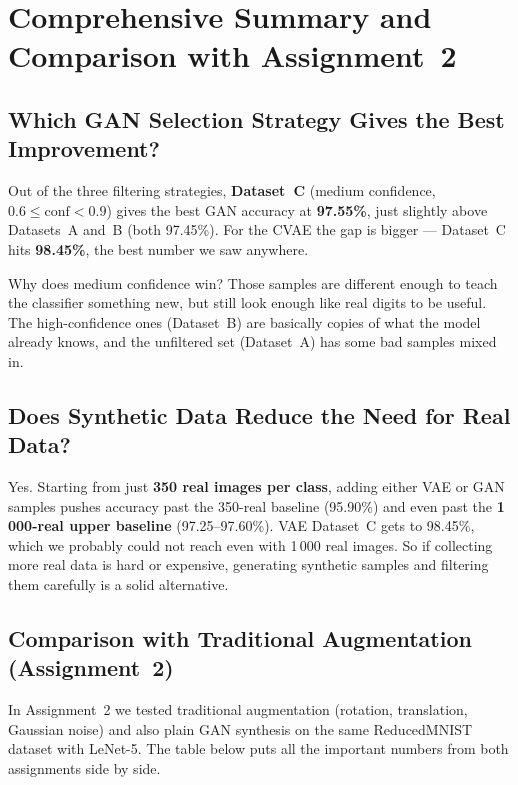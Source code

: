 \documentclass[12pt, a4paper]{article}
\begin{document}
\section{Comprehensive Summary and Comparison with Assignment~2}

\subsection{Which GAN Selection Strategy Gives the Best Improvement?}

Out of the three filtering strategies, \textbf{Dataset~C} (medium confidence,
$0.6 \leq \text{conf} < 0.9$) gives the best GAN accuracy at \textbf{97.55\%},
just slightly above Datasets~A and~B (both 97.45\%).  For the CVAE the gap is
bigger --- Dataset~C hits \textbf{98.45\%}, the best number we saw anywhere.

Why does medium confidence win?  Those samples are different enough to teach the
classifier something new, but still look enough like real digits to be useful.
The high-confidence ones (Dataset~B) are basically copies of what the model
already knows, and the unfiltered set (Dataset~A) has some bad samples mixed in.

\subsection{Does Synthetic Data Reduce the Need for Real Data?}

Yes.  Starting from just \textbf{350 real images per class}, adding either VAE or
GAN samples pushes accuracy past the 350-real baseline (95.90\%) and even past
the \textbf{1\,000-real upper baseline} (97.25--97.60\%).  VAE Dataset~C gets to
98.45\%, which we probably could not reach even with 1\,000 real images.
So if collecting more real data is hard or expensive, generating synthetic
samples and filtering them carefully is a solid alternative.

\subsection{Comparison with Traditional Augmentation (Assignment~2)}

In Assignment~2 we tested traditional augmentation (rotation, translation, Gaussian noise)
and also plain GAN synthesis on the same ReducedMNIST dataset with LeNet-5.
The table below puts all the important numbers from both assignments side by side.
\end{document}

